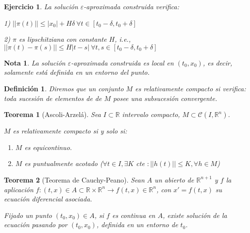 \documentclass{article}
\theoremstyle{theorem-style}  %
\newtheorem{theorem}{Teorema}[section]  %
\theoremstyle{definition-style}
\newtheorem{definition}{Definición}[section]
\newtheorem*{note}{Nota} %
\theoremstyle{example-style}
\newtheorem{exercise}{Ejercicio}[section]
\begin{document}
\begin{exercise}
	La solución  $ \varepsilon $-aproximada construida verifica:
	
	1) $ ||\pi(t)||\leq |x_0|+H\delta \ \forall t \in [t_0-\delta,t_0+\delta]$
	
	2) $ \pi $ es lipschitziana con constante $ H $, i.e., $ ||\pi(t)- \pi(s)|| \leq H |t-s| \ \forall t,s \in [t_0-\delta, t_0+\delta] $
\end{exercise}

\begin{note}
	La solución $ \varepsilon $-aproximada construida es local en $ (t_0,x_0) $, es decir, solamente está definida en un entorno del punto.
\end{note}

\begin{definition}
	Diremos que un conjunto $ M $ es \emph{relativamente compacto} si verifica: toda sucesión de elementos de de $ M $ posee una subsucesión convergente.
\end{definition}
\begin{theorem}[Ascoli-Arzelá]
	Sea $ I\subset \mathbb{R} $ intervalo compacto, $ M \subset \mathcal{C} (I, \mathbb{R}^n) $.
	
	$ M $ es relativamente compacto si y solo si:
	\begin{enumerate}[\quad 1)]
		\item $ M $ es equicontinuo.
		\item  $ M $ es puntualmente acotado ($ \forall t \in I,\exists K $ cte $ :||h(t)||\leq K , \forall h \in M$)
	\end{enumerate}
\end{theorem}
\begin{theorem}[Teorema de Cauchy-Peano]\label{cauchy-peano}
	Sean $ A $ un abierto de $ \mathbb{R}^{n+1} $ y $ f $ la aplicación $ f:(t,x)\in A\subset \mathbb{R}\times \mathbb{R}^n \longrightarrow f(t,x)\in \mathbb{R}^n $, con $  x'=f(t,x) $ su ecuación diferencial asociada. 
	
	Fijado un punto $ (t_0,x_0) \in A $, si $ f $ es continua en $ A $, existe solución de la ecuación pasando por $ (t_0,x_0) $, definida en un entorno de $ t_0 $.
\end{theorem}
\end{document}
